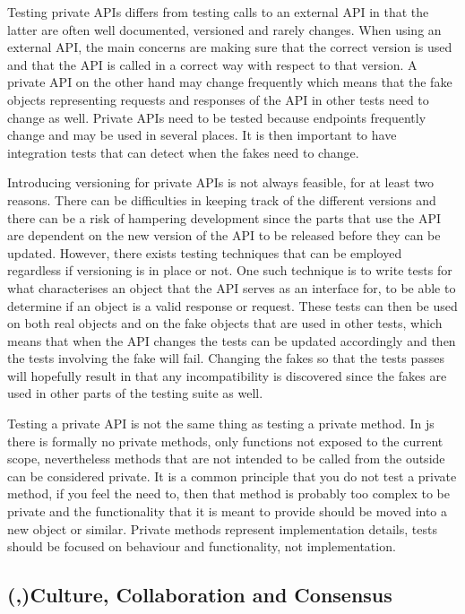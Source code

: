 \documentclass[11pt]{article}
\begin{document}
Testing private APIs differs from testing calls to an external API in that the latter are often well documented, versioned and rarely changes. When using an external API, the main concerns are making sure that the correct version is used and that the API is called in a correct way with respect to that version. A private API on the other hand may change frequently which means that the fake objects representing requests and responses of the API in other tests need to change as well. Private APIs need to be tested because endpoints frequently change and may be used in several places. It is then important to have integration tests that can detect when the fakes need to change. \cite[questions~34,~36]{Edelstam}

Introducing versioning for private APIs is not always feasible, for at least two reasons. There can be difficulties in keeping track of the different versions and there can be a risk of hampering development since the parts that use the API are dependent on the new version of the API to be released before they can be updated. However, there exists testing techniques that can be employed regardless if versioning is in place or not. One such technique is to write tests for what characterises an object that the API serves as an interface for, to be able to determine if an object is a valid response or request. These tests can then be used on both real objects and on the fake objects that are used in other tests, which means that when the API changes the tests can be updated accordingly and then the tests involving the fake will fail. Changing the fakes so that the tests passes will hopefully result in that any incompatibility is discovered since the fakes are used in other parts of the testing suite as well. \cite[question~34]{Edelstam}

Testing a private API is not the same thing as testing a private method. In \gls{js} there is formally no private methods, only functions not exposed to the current scope, nevertheless methods that are not intended to be called from the outside can be considered private. It is a common principle that you do not test a private method, if you feel the need to, then that method is probably too complex to be private and the functionality that it is meant to provide should be moved into a new object or similar. Private methods represent implementation details, tests should be focused on behaviour and functionality, not implementation. \cite[questions~62-63]{Edelstam}

\subsection{(,)Culture, Collaboration and Consensus}
\label{subsec:ccc}
\end{document}
